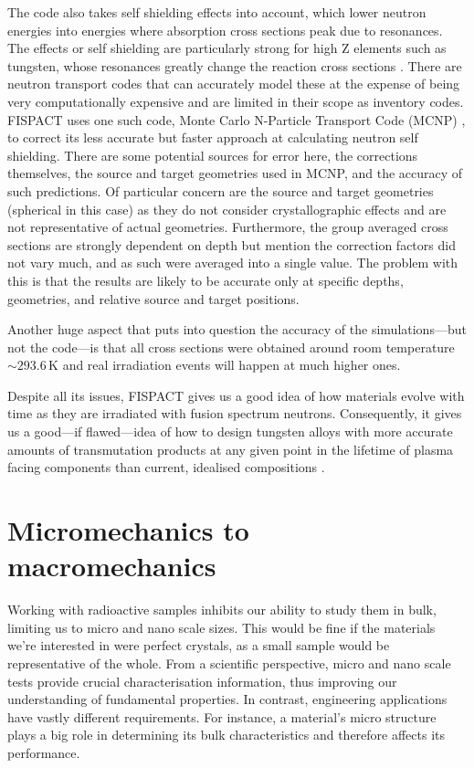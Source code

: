 \documentclass[12pt, a4paper]{article}
\begin{document}
		The code also takes self shielding effects into account, which lower neutron energies into energies where absorption cross sections peak due to resonances. The effects or self shielding are particularly strong for high Z elements such as tungsten, whose resonances greatly change the reaction cross sections \cite{library,transmute2}. There are neutron transport codes that can accurately model these at the expense of being very computationally expensive and are limited in their scope as inventory codes. FISPACT uses one such code, Monte Carlo N-Particle Transport Code (MCNP) \cite{mcnp}, to correct its less accurate but faster approach at calculating neutron self shielding. There are some potential sources for error here, the corrections themselves, the source and target geometries used in MCNP, and the accuracy of such predictions. Of particular concern are the source and target geometries (spherical in this case) as they do not consider crystallographic effects and are not representative of actual geometries. Furthermore, the group averaged cross sections are strongly dependent on depth but \citet{transmute2} mention the correction factors did not vary much, and as such were averaged into a single value. The problem with this is that the results are likely to be accurate only at specific depths, geometries, and relative source and target positions.
		
		Another huge aspect that puts into question the accuracy of the simulations---but not the code---is that all cross sections were obtained around room temperature $\sim 293.6\,\textrm{K}$ \cite{transmute2} and real irradiation events will happen at much higher ones.
		
		Despite all its issues, FISPACT \cite{fispact} gives us a good idea of how materials evolve with time as they are irradiated with fusion spectrum neutrons. Consequently, it gives us a good---if flawed---idea of how to design tungsten alloys with more accurate amounts of transmutation products at any given point in the lifetime of plasma facing components than current, idealised compositions \cite{ionirrmic, ionirrprop, ionirrprop2, hardening}.
	\section{Micromechanics to macromechanics}\label{s:mm}
		Working with radioactive samples inhibits our ability to study them in bulk, limiting us to micro and nano scale sizes. This would be fine if the materials we're interested in were perfect crystals, as a small sample would be representative of the whole. From a scientific perspective, micro and nano scale tests provide crucial characterisation information, thus improving our understanding of fundamental properties. In contrast, engineering applications have vastly different requirements. For instance, a material's micro structure plays a big role in determining its bulk characteristics \cite{ionirrmic} and therefore affects its performance.
		
\end{document}
